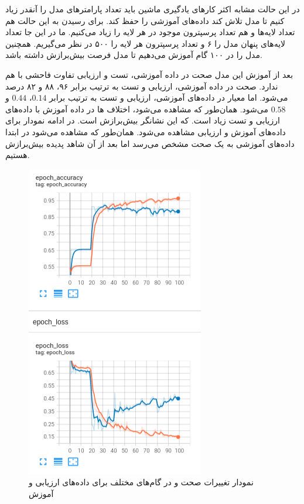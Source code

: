 \documentclass[12pt, a4paper]{article}
\begin{document}
در این حالت مشابه اکثر کار‌های یادگیری ماشین باید تعداد پارامتر‌های مدل را آنقدر زیاد کنیم تا
مدل تلاش کند داده‌های آموزشی را حفظ کند. برای رسیدن به این حالت هم تعداد لایه‌ها و
هم تعداد پرسپترون موجود در هر لایه را زیاد می‌کنیم. ما در این جا تعداد لایه‌های پنهان مدل را ۶ و تعداد
پرسپترون هر لایه را ۵۰۰ در نظر می‌گیریم. همچنین مدل را در ۱۰۰ گام آموزش می‌دهیم تا مدل فرصت بیش‌برازش داشته باشد.

بعد از آموزش این مدل صحت در داده آموزشی، تست و ارزیابی تفاوت فاحشی با هم ندارد. صحت
در داده‌ آموزشی، ارزیابی و تست به ترتیب برابر ۹۶، ۸۸ و ۸۲ درصد می‌شود. اما معیار 
در داده‌های آموزشی، ارزیابی و تست به ترتیب برابر $0.14$، $0.44$ و $0.58$ می‌شود. همان‌طور
که مشاهده می‌شود، اختلاف ها در داده‌ آموزش با داده‌های ارزیابی و تست زیاد است.
که این نشانگر بیش‌برازش است. در ادامه نمودار برای داده‌های آموزش و ارزیابی مشاهده می‌شود.
همان‌طور که مشاهده می‌شود در ابتدا داده‌های آموزشی به یک صحت مشخص می‌رسد اما بعد از آن شاهد
پدیده بیش‌برازش هستیم.

\begin{figure}[h]
    \centering
    \includegraphics[scale=0.5]{images/graph.png}
    \caption{نمودار تغییرات صحت و  در گام‌های مختلف برای داده‌های ارزیابی و آموزش}
    \label{loss}
\end{figure}
\end{document}
